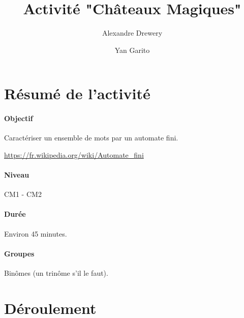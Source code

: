 \documentclass[a4paper,11pt]{article}%
\title{Activité "Châteaux Magiques"}%
\author{Alexandre Drewery \and Yan Garito}%
\date{}%
\begin{document}
%

\maketitle%

\section{Résumé de l'activité}

\paragraph{Objectif}
Caractériser un ensemble de mots par un automate fini.

\url{https://fr.wikipedia.org/wiki/Automate_fini}

\paragraph{Niveau}
CM1 - CM2

\paragraph{Durée}
Environ 45 minutes.

\paragraph{Groupes}
Binômes (un trinôme s'il le faut).

\section{Déroulement}
\end{document}
